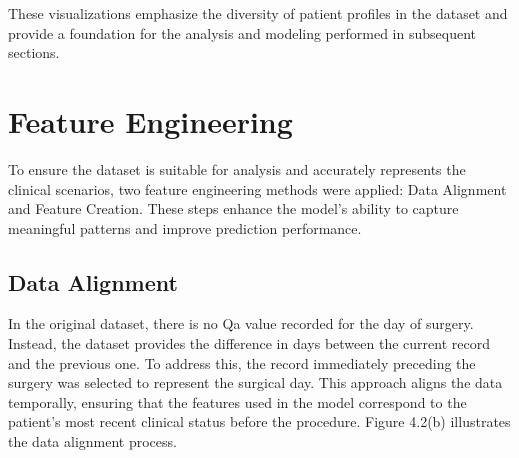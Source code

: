 These visualizations emphasize the diversity of patient profiles in the dataset and provide a foundation for the analysis and modeling performed in subsequent sections.
\newpage
\section{Feature Engineering}

To ensure the dataset is suitable for analysis and accurately represents the clinical scenarios, two feature engineering methods were applied: Data Alignment and Feature Creation. These steps enhance the model's ability to capture meaningful patterns and improve prediction performance.

\subsection{Data Alignment}

In the original dataset, there is no Qa value recorded for the day of surgery. Instead, the dataset provides the difference in days between the current record and the previous one. To address this, the record immediately preceding the surgery was selected to represent the surgical day. This approach aligns the data temporally, ensuring that the features used in the model correspond to the patient's most recent clinical status before the procedure. Figure 4.2(b) illustrates the data alignment process.

